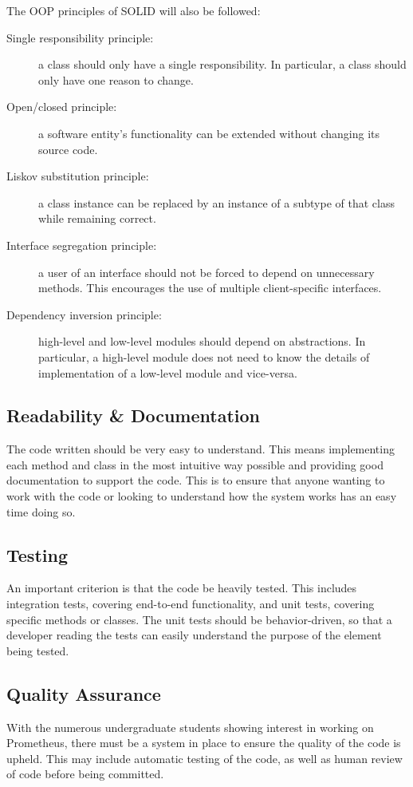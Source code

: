 \documentclass[titlepage,11pt]{article}
\begin{document}
The OOP principles of SOLID \cite{martin_2009} will also be followed:

\begin{description}
	\item[Single responsibility principle:] a class should only have a single responsibility. In particular, a class should only have one reason to change.
	
	\item[Open/closed principle:] a software entity's functionality can be extended without changing its source code.
	
	\item[Liskov substitution principle:] a class instance can be replaced by an instance of a subtype of that class while remaining correct.
	
	\item[Interface segregation principle:] a user of an interface should not be forced to depend on unnecessary methods. This encourages the use of multiple client-specific interfaces.
	
	\item[Dependency inversion principle:] high-level and low-level modules should depend on abstractions. In particular, a high-level module does not need to know the details of implementation of a low-level module and vice-versa.
\end{description}

\subsection{Readability \& Documentation}
The code written should be very easy to understand. This means implementing each method and class in the most intuitive way possible and providing good documentation to support the code. This is to ensure that anyone wanting to work with the code or looking to understand how the system works has an easy time doing so.

\subsection{Testing}
An important criterion is that the code be heavily tested. This includes integration tests, covering end-to-end functionality, and unit tests, covering specific methods or classes. The unit tests should be behavior-driven, so that a developer reading the tests can easily understand the purpose of the element being tested.

\subsection{Quality Assurance}
With the numerous undergraduate students showing interest in working on Prometheus, there must be a system in place to ensure the quality of the code is upheld. This may include automatic testing of the code, as well as human review of code before being committed.
\end{document}
